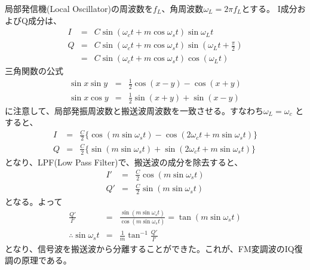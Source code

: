 局部発信機(Local Oscillator)の周波数を$f_L$、角周波数$\omega_L = 2\pi f_L$とする。
I成分およびQ成分は、
\begin{eqnarray*}
I &=& C\sin(\omega_ct + m\cos\omega_st)\sin\omega_Lt\\
Q &=& C\sin(\omega_ct + m\cos\omega_st)\sin(\omega_Lt + \frac{\pi}{2}) \nonumber\\
&=& C\sin(\omega_ct + m\cos\omega_st)\cos(\omega_Lt)
\end{eqnarray*}
三角関数の公式
\begin{eqnarray}
\sin x \sin y &=& \frac{1}{2}{\cos(x-y) - \cos(x+y)} \nonumber\\
\sin x \cos y &=& \frac{1}{2}{\sin(x+y) + \sin(x-y)} \nonumber
\end{eqnarray}
に注意して、局部発振周波数と搬送波周波数を一致させる。すなわち$\omega_L = \omega_c$
とすると、
\begin{eqnarray}
I &=& \frac{C}{2}\{\cos(m\sin\omega_st) - \cos(2\omega_ct + m\sin\omega_st)\}\nonumber\\
Q &=& \frac{C}{2}\{\sin(m\sin\omega_st) + \sin(2\omega_ct + m\sin\omega_st)\}\nonumber
\end{eqnarray}
となり、LPF(Low Pass Filter)で、搬送波の成分を除去すると、
\begin{eqnarray}
I' &=& \frac{C}{2}\cos(m\sin\omega_st)\nonumber\\
Q' &=& \frac{C}{2}\sin(m\sin\omega_st)\nonumber
\end{eqnarray}
となる。よって
\begin{eqnarray*}
  \frac{Q'}{I'} &=& \frac{\sin(m\sin\omega_st)}{\cos(m\sin\omega_st)} = \tan(m\sin\omega_st)\\
  \therefore \sin\omega_st &=& \frac{1}{m}\tan^{-1}\frac{Q'}{I'}
\end{eqnarray*}
となり、信号波を搬送波から分離することができた。これが、FM変調波のIQ復調の原理である。
